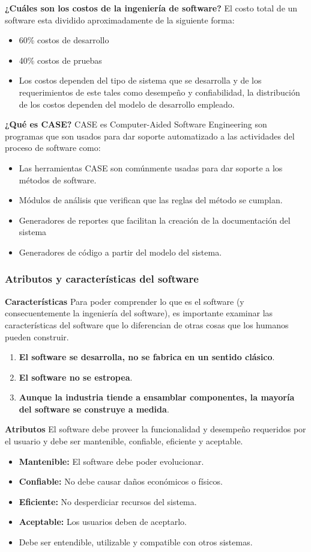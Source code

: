 \documentclass[12pt,twoside]{article}
\begin{document}
\textbf{¿Cuáles son los costos de la ingeniería de software?}
El costo total de un software esta dividido aproximadamente de la siguiente forma:
\begin{itemize}
    \item 60\% costos de desarrollo
    \item 40\% costos de pruebas
    \item Los costos dependen del tipo de sistema que se desarrolla y de los 
    requerimientos de este tales como desempeño y confiabilidad, la distribución de 
    los costos dependen del modelo de desarrollo empleado. 
\end{itemize}
\textbf{¿Qué es CASE?}
CASE es Computer-Aided Software Engineering son programas que son usados para dar
soporte automatizado a las actividades del proceso de software como:
\begin{itemize}
    \item Las herramientas CASE son comúnmente usadas para dar soporte a los métodos de
    software.
    \item Módulos de análisis que verifican que las reglas del método se cumplan.
    \item Generadores de reportes que facilitan la creación de la documentación del sistema
    \item Generadores de código a partir del modelo del sistema.
\end{itemize}
\subsubsection{Atributos y características del software}
\textbf{Características}
Para poder comprender lo que es el software (y consecuentemente la ingeniería del 
software), es importante examinar las características del software que lo diferencian de 
otras cosas que los humanos pueden construir.
\begin{enumerate}
    \item \textbf{El software se desarrolla, no se fabrica en un sentido clásico}.
    \item \textbf{El software no se estropea}.
    \item \textbf{Aunque la industria tiende a ensamblar componentes, la mayoría del software 
    se construye a medida}.
\end{enumerate}
\textbf{Atributos}
El software debe proveer la funcionalidad y desempeño requeridos por el usuario y
debe ser mantenible, confiable, eficiente y aceptable.
\begin{itemize}
    \item \textbf{Mantenible:} El software debe poder evolucionar.
    \item \textbf{Confiable:} No debe causar daños económicos o físicos.
    \item \textbf{Eficiente:} No desperdiciar recursos del sistema.
    \item \textbf{Aceptable:} Los usuarios deben de aceptarlo.
    \item Debe ser entendible, utilizable y compatible con otros sistemas.
\end{itemize}
\end{document}
